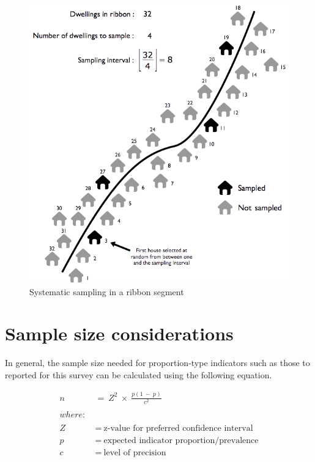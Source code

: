 \documentclass[12pt,a4paper]{book}
\theoremstyle{definition}
\theoremstyle{definition}
\theoremstyle{definition}
\theoremstyle{remark}
\begin{document}
\begin{figure}[H]

{\centering \includegraphics[width=8.38in]{figures/stage2sample9} 

}

\caption{Systematic sampling in a ribbon segment}\label{fig:sample23}
\end{figure}

\hypertarget{samplesize}{%
\section{Sample size considerations}\label{samplesize}}

In general, the sample size needed for proportion-type indicators such
as those to reported for this survey can be calculated using the
following equation.

\[\begin{aligned}
n & ~ = ~ Z^2 ~ \times ~ \frac{p(1 ~ - ~ p)}{c ^ 2} \\
\\
where: & \\
\\
Z & ~ = ~ \text{z-value for preferred confidence interval} \\
p & ~ = ~ \text{expected indicator proportion/prevalence} \\
c & ~ = ~ \text{level of precision}
\end{aligned}\]
\end{document}
